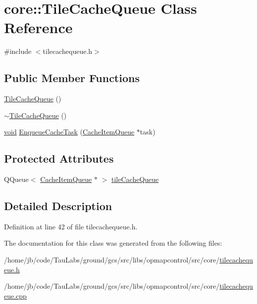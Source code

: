 \hypertarget{classcore_1_1_tile_cache_queue}{\section{core\-:\-:\-Tile\-Cache\-Queue \-Class \-Reference}
\label{classcore_1_1_tile_cache_queue}
}


{\ttfamily \#include $<$tilecachequeue.\-h$>$}

\subsection*{\-Public \-Member \-Functions}
\begin{DoxyCompactItemize}
\item 
\hyperlink{group___o_p_map_widget_gaf4b26a2fbfd128dce8b96fa82f4230dd}{\-Tile\-Cache\-Queue} ()
\item 
\hyperlink{group___o_p_map_widget_ga09862b0024b636bee196029e0a98cfc4}{$\sim$\-Tile\-Cache\-Queue} ()
\item 
\hyperlink{group___u_a_v_objects_plugin_ga444cf2ff3f0ecbe028adce838d373f5c}{void} \hyperlink{group___o_p_map_widget_gaa3b5dbe5d3c7b4f98f540bb4bb38f3d1}{\-Enqueue\-Cache\-Task} (\hyperlink{classcore_1_1_cache_item_queue}{\-Cache\-Item\-Queue} $\ast$task)
\end{DoxyCompactItemize}
\subsection*{\-Protected \-Attributes}
\begin{DoxyCompactItemize}
\item 
\-Q\-Queue$<$ \hyperlink{classcore_1_1_cache_item_queue}{\-Cache\-Item\-Queue} $\ast$ $>$ \hyperlink{group___o_p_map_widget_ga6bb4a109ac678df86dff7fe8a1a02944}{tile\-Cache\-Queue}
\end{DoxyCompactItemize}


\subsection{\-Detailed \-Description}


\-Definition at line 42 of file tilecachequeue.\-h.



\-The documentation for this class was generated from the following files\-:\begin{DoxyCompactItemize}
\item 
/home/jb/code/\-Tau\-Labs/ground/gcs/src/libs/opmapcontrol/src/core/\hyperlink{tilecachequeue_8h}{tilecachequeue.\-h}\item 
/home/jb/code/\-Tau\-Labs/ground/gcs/src/libs/opmapcontrol/src/core/\hyperlink{tilecachequeue_8cpp}{tilecachequeue.\-cpp}\end{DoxyCompactItemize}
